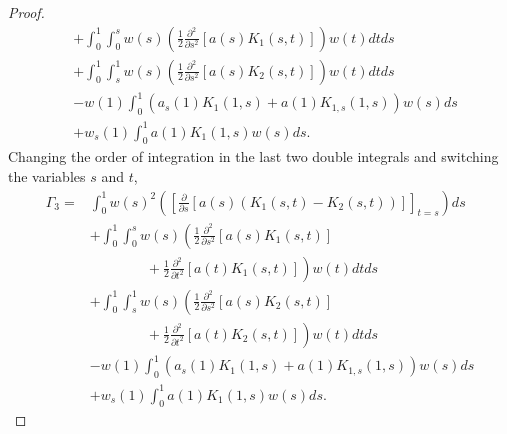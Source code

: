 \documentclass[9pt,journal,twocolumn]{IEEEtran}
\newcommand{\pfs}{\frac{\partial}{\partial s}}
\newcommand{\igzo}{\int_0^1}
\newcommand{\igzs}{\int_0^s}
\newcommand{\igso}{\int_s^1}
\newcommand{\hlf}{\frac{1}{2}}
\begin{document}
\begin{proof}
\begin{align}
 &+  \igzo \igzs w(s) \left(\hlf \frac{\partial^2}{\partial s^2}\left[a(s)K_1(s,t) \right] \right) w(t) d t ds \nonumber \\
 &+ \igzo \igso w(s) \left(\hlf \frac{\partial^2}{\partial s^2}\left[a(s)K_2(s,t) \right] \right) w(t) d t ds \nonumber \\
 &  - w(1) \igzo \left(a_s(1)K_1(1,s)+a(1)K_{1,s}(1,s) \right) w(s) ds \nonumber \\
 &   + w_s(1) \igzo a(1)K_1(1,s) w(s)ds. \nonumber
 \end{align} Changing the order of integration in the last two double integrals and switching the variables $s$ and $t$,
 \begin{align}
 \Gamma_3 =& \igzo w(s)^2\left( \left[ \pfs \left[a(s)(K_1(s,t)-K_2(s,t)) \right] \right]_{t=s} \right) ds \nonumber \\
 & +  \igzo \igzs w(s) \left(\hlf \frac{\partial^2}{\partial s^2}\left[a(s)K_1(s,t) \right] \right. \nonumber \\
 &\left. \qquad \qquad +\hlf \frac{\partial^2}{\partial t^2}\left[a(t)K_1(s,t) \right] \right) w(t) d t ds \nonumber \\
 &+ \igzo \igso w(s) \left(\hlf \frac{\partial^2}{\partial s^2}\left[a(s)K_2(s,t) \right] \right. \nonumber \\
 &\left. \qquad \qquad +\hlf \frac{\partial^2}{\partial t^2}\left[a(t)K_2(s,t) \right] \right) w(t) d t ds \nonumber \\
 &  - w(1) \igzo \left(a_s(1)K_1(1,s)+a(1)K_{1,s}(1,s) \right) w(s) ds \nonumber \\
 &\label{Gamma_3}   + w_s(1) \igzo a(1)K_1(1,s) w(s)ds.
 \end{align}
 

\end{proof}
\end{document}

